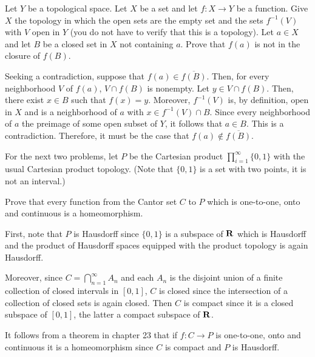 \begin{problem}
  Let $Y$ be a topological space. Let $X$ be a set and let $f\colon X\to Y$
  be a function. Give $X$ the topology in which the open sets are the empty
  set and the sets $f^{-1}(V)$ with $V$ open in $Y$ (you do not have to
  verify that this is a topology). Let $a\in X$ and let $B$ be a closed set
  in $X$ not containing $a$. Prove that $f(a)$ is not in the closure of
  $f(B)$.
\end{problem}
\begin{solution}
  Seeking a contradiction, suppose that $f(a)\in\overline{f(B)}$. Then, for
  every neighborhood $V$ of $f(a)$, $V\cap f(B)$ is nonempty. Let
  $y\in V\cap f(B)$. Then, there exist $x\in B$ such that
  $f(x)=y$. Moreover, $f^{-1}(V)$ is, by definition, open in $X$ and is a
  neighborhood of $a$ with $x\in f^{-1}(V)\cap B$. Since every neighborhood
  of $a$ the preimage of some open subset of $Y$, it follows that $a\in
  B$. This is a contradiction. Therefore, it must be the case that
  $f(a)\notin\overline{f(B)}$.
\end{solution}

For the next two problems, let $P$ be the Cartesian product
$\prod_{i=1}^\infty\{0,1\}$ with the usual Cartesian product
topology. (Note that $\{0,1\}$ is a set with two points, it is not an
interval.)
\begin{problem}
  Prove that every function from the Cantor set $C$ to $P$ which is
  one-to-one, onto and continuous is a homeomorphism.
\end{problem}
\begin{solution}
  First, note that $P$ is Hausdorff since $\{0,1\}$ is a subspace of $\mathbf{R}$
  which is Hausdorff and the product of Hausdorff spaces equipped with the
  product topology is again Hausdorff.

  Moreover, since $C=\bigcap_{n=1}^\infty A_n$ and each $A_n$ is the
  disjoint union of a finite collection of closed intervals in $[0,1]$, $C$
  is closed since the intersection of a collection of closed sets is again
  closed. Then $C$ is compact since it is a closed subspace of $[0,1]$, the
  latter a compact subspace of $\mathbf{R}$.

  It follows from a theorem in chapter 23 that if $f\colon C\to P$ is
  one-to-one, onto and continuous it is a homeomorphism since $C$ is
  compact and $P$ is Hausdorff.
\end{solution}

